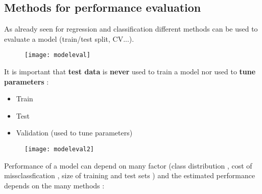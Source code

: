 \subsection{Methods for performance evaluation}
As already seen for regression and classification different methods can be used to evaluate a model (train/test split, CV...).
\begin{figure}[H]
  \centering
  \texttt{[image: modeleval]}
\end{figure}
It is important that \textbf{test data} is \textbf{never} used to train a model nor used to \textbf{tune parameters} :
\begin{itemize}
\item Train 
\item Test
\item Validation (used to tune parameters)
\end{itemize}
\begin{figure}[H]
  \centering
  \texttt{[image: modeleval2]}
\end{figure}
Performance of a model can depend on many factor (class distribution , cost of missclassfication , size of training and test sets ) and the estimated performance depends on the many methods :

